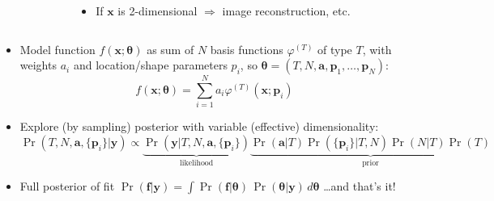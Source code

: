 \documentclass[%
    9pt,
]{beamer}
\newcommand{\vect}[1]{\mathbf{#1}}
\newcommand{\bg}[1]{\mathbf{#1}}
\newcommand{\red}[1]{\textcolor{cambblue}{#1}}
\newcommand{\rr}{\Rightarrow}
\begin{document}
\begin{frame}
\begin{columns}
\begin{column}{0.25\textwidth}
        \end{column}
        \begin{column}{0.5\textwidth}
            \begin{itemize}
                \item If $\vect{x}$ is \red{2-dimensional} 
                    $\rr$ \red{image reconstruction}, etc.
            \end{itemize}

        \end{column}
    \end{columns}

    \begin{itemize}
        \item Model function $f(\vect{x};\bg{\theta})$ as \red{sum} of $N$
            \red{basis functions} $\varphi^{(T)}$ of type $T$,
            with \red{weights} $a_i$ and \red{location/shape} parameters $p_i$, 
            so $\bg{\theta} = (T, N, \vect{a}, \vect{p}_1,\ldots,\vect{p}_N)$:
            \[
                f(\vect{x};\bg{\theta}) 
                =
                \sum_{i=1}^N a_i\varphi^{(T)}(\vect{x};\vect{p}_i)
            \]
        \item Explore (by sampling) posterior with \red{variable (effective) dimensionality}:
            \[
                \Pr(T,N,\vect{a},\{\vect{p}_i\}|\vect{y})
                \propto \underbrace{\Pr(\vect{y}|T,N,\vect{a},\{\vect{p}_i\})}_{\mbox{likelihood}}
                \underbrace{\Pr(\vect{a}|T)\Pr(\{\vect{p}_i\}|T,N)
                \Pr(N|T)\Pr(T)}_{\mbox{prior}}
            \]
        \item Full \red{posterior} of fit $\Pr(\bg{f}|\bg{y}) = {\displaystyle \int \Pr(\bg{f}|\bg{\theta})\,\Pr(\bg{\theta}|\bg{y})\,d\bg{\theta}}$
            \ldots and that's it!
    \end{itemize}




\end{frame}
\end{document}
